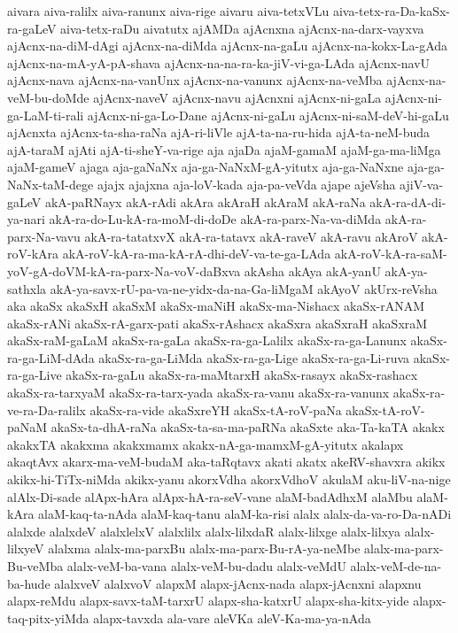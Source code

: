 {aivara
aiva-ralilx
aiva-ranunx
aiva-rige
aivaru
aiva-tetxVLu
aiva-tetx-ra-Da-kaSx-ra-gaLeV
aiva-tetx-raDu
aivatutx
ajAMDa
ajAcnxna
ajAcnx-na-darx-vayxva
ajAcnx-na-diM-dAgi
ajAcnx-na-diMda
ajAcnx-na-gaLu
ajAcnx-na-kokx-La-gAda
ajAcnx-na-mA-yA-pA-shava
ajAcnx-na-na-ra-ka-jiV-vi-ga-LAda
ajAcnx-navU
ajAcnx-nava
ajAcnx-na-vanUnx
ajAcnx-na-vanunx
ajAcnx-na-veMba
ajAcnx-na-veM-bu-doMde
ajAcnx-naveV
ajAcnx-navu
ajAcnxni
ajAcnx-ni-gaLa
ajAcnx-ni-ga-LaM-ti-rali
ajAcnx-ni-ga-Lo-Dane
ajAcnx-ni-gaLu
ajAcnx-ni-saM-deV-hi-gaLu
ajAcnxta
ajAcnx-ta-sha-raNa
ajA-ri-liVle
ajA-ta-na-ru-hida
ajA-ta-neM-buda
ajA-taraM
ajAti
ajA-ti-sheY-va-rige
aja
ajaDa
ajaM-gamaM
ajaM-ga-ma-liMga
ajaM-gameV
ajaga
aja-gaNaNx
aja-ga-NaNxM-gA-yitutx
aja-ga-NaNxne
aja-ga-NaNx-taM-dege
ajajx
ajajxna
aja-loV-kada
aja-pa-veVda
ajape
ajeVsha
ajiV-va-gaLeV
akA-paRNayx
akA-rAdi
akAra
akAraH
akAraM
akA-raNa
akA-ra-dA-di-ya-nari
akA-ra-do-Lu-kA-ra-moM-di-doDe
akA-ra-parx-Na-va-diMda
akA-ra-parx-Na-vavu
akA-ra-tatatxvX
akA-ra-tatavx
akA-raveV
akA-ravu
akAroV
akA-roV-kAra
akA-roV-kA-ra-ma-kA-rA-dhi-deV-va-te-ga-LAda
akA-roV-kA-ra-saM-yoV-gA-doVM-kA-ra-parx-Na-voV-daBxva
akAsha
akAya
akA-yanU
akA-ya-sathxla
akA-ya-savx-rU-pa-va-ne-yidx-da-na-Ga-liMgaM
akAyoV
akUrx-reVsha
aka
akaSx
akaSxH
akaSxM
akaSx-maNiH
akaSx-ma-Nishacx
akaSx-rANAM
akaSx-rANi
akaSx-rA-garx-pati
akaSx-rAshacx
akaSxra
akaSxraH
akaSxraM
akaSx-raM-gaLaM
akaSx-ra-gaLa
akaSx-ra-ga-Lalilx
akaSx-ra-ga-Lanunx
akaSx-ra-ga-LiM-dAda
akaSx-ra-ga-LiMda
akaSx-ra-ga-Lige
akaSx-ra-ga-Li-ruva
akaSx-ra-ga-Live
akaSx-ra-gaLu
akaSx-ra-maMtarxH
akaSx-rasayx
akaSx-rashacx
akaSx-ra-tarxyaM
akaSx-ra-tarx-yada
akaSx-ra-vanu
akaSx-ra-vanunx
akaSx-ra-ve-ra-Da-ralilx
akaSx-ra-vide
akaSxreYH
akaSx-tA-roV-paNa
akaSx-tA-roV-paNaM
akaSx-ta-dhA-raNa
akaSx-ta-sa-ma-paRNa
akaSxte
aka-Ta-kaTA
akakx
akakxTA
akakxma
akakxmamx
akakx-nA-ga-mamxM-gA-yitutx
akalapx
akaqtAvx
akarx-ma-veM-budaM
aka-taRqtavx
akati
akatx
akeRV-shavxra
akikx
akikx-hi-TiTx-niMda
akikx-yanu
akorxVdha
akorxVdhoV
akulaM
aku-liV-na-nige
alAlx-Di-sade
alApx-hAra
alApx-hA-ra-seV-vane
alaM-badAdhxM
alaMbu
alaM-kAra
alaM-kaq-ta-nAda
alaM-kaq-tanu
alaM-ka-risi
alalx
alalx-da-va-ro-Da-nADi
alalxde
alalxdeV
alalxlelxV
alalxlilx
alalx-lilxdaR
alalx-lilxge
alalx-lilxya
alalx-lilxyeV
alalxma
alalx-ma-parxBu
alalx-ma-parx-Bu-rA-ya-neMbe
alalx-ma-parx-Bu-veMba
alalx-veM-ba-vana
alalx-veM-bu-dadu
alalx-veMdU
alalx-veM-de-na-ba-hude
alalxveV
alalxvoV
alapxM
alapx-jAcnx-nada
alapx-jAcnxni
alapxnu
alapx-reMdu
alapx-savx-taM-tarxrU
alapx-sha-katxrU
alapx-sha-kitx-yide
alapx-taq-pitx-yiMda
alapx-tavxda
ala-vare
aleVKa
aleV-Ka-ma-ya-nAda
}
